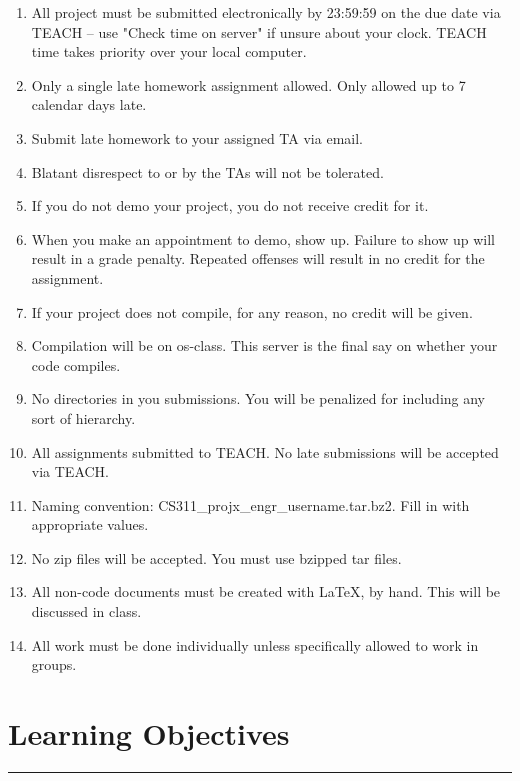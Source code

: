 \documentclass[letterpaper,10pt,titlepage,fleqn]{article}
\begin{document}
\begin{enumerate}
\item All project must be submitted electronically by 23:59:59 on the due date via TEACH – use "Check time on server" if unsure about your clock. TEACH time takes priority over your local computer.
\item Only a single late homework assignment allowed. Only allowed up to 7 calendar days late.
\item Submit late homework to your assigned TA via email.
\item Blatant disrespect to or by the TAs will not be tolerated. 
\item If you do not demo your project, you do not receive credit for it. 
\item When you make an appointment to demo, show up. Failure to show up will result in a grade penalty. Repeated offenses will result in no credit for the assignment. 
\item If your project does not compile, for any reason, no credit will be given.
\item Compilation will be on os-class. This server is the ﬁnal say on whether your code compiles. 
\item No directories in you submissions. You will be penalized for including any sort of hierarchy.
\item All assignments submitted to TEACH. No late submissions will be accepted via TEACH.
\item Naming convention: CS311\_proj\textlangle x\textrangle \_\textlangle engr\_username\textrangle.tar.bz2. Fill \textlangle \textrangle  in with appropriate values.
\item No zip ﬁles will be accepted. You must use bzipped tar ﬁles.
\item All non-code documents must be created with LaTeX, by hand. This will be discussed in class.
\item All work must be done individually unless speciﬁcally allowed to work in groups.
\end{enumerate}

\section*{Learning Objectives}
\hrule
\end{document}
